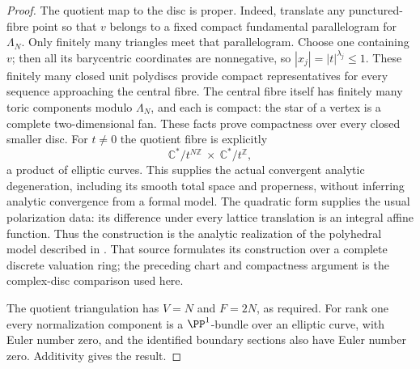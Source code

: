 \begin{proof}
The quotient map to the disc is proper. Indeed, translate any
punctured-fibre point so that $v$ belongs to a fixed compact
fundamental parallelogram for $\Lambda_N$. Only finitely many
triangles meet that parallelogram. Choose one containing $v$;
then all its barycentric coordinates are nonnegative, so
$|x_j|=|t|^{\lambda_j}\le1$. These finitely many closed unit
polydiscs provide compact representatives for every sequence
approaching the central fibre. The central fibre itself has
finitely many toric components modulo $\Lambda_N$, and each is
compact: the star of a vertex is a complete two-dimensional fan.
These facts prove compactness over every closed smaller disc.
For $t\ne0$ the quotient fibre is explicitly
\[
 \mathbb C^*/t^{N\mathbb Z}\ \times\
 \mathbb C^*/t^{\mathbb Z},
\]
a product of elliptic curves. This supplies the actual convergent
analytic degeneration, including its smooth total space and
properness, without inferring analytic convergence from a formal
model. The quadratic form supplies the usual polarization data:
its difference under every lattice translation is an integral
affine function. Thus the construction is the analytic realization
of the polyhedral model described in
\cite[Section~6, especially (6.3)--(6.7)]{Mumford1972}.
That source formulates its construction over a complete discrete
valuation ring; the preceding chart and compactness argument is
the complex-disc comparison used here.

The quotient triangulation has $V=N$ and $F=2N$, as required.
For rank one every normalization component is a $\PP^1$-bundle over an elliptic curve, with Euler number zero, and the identified boundary sections also have Euler number zero. Additivity gives the result.
\end{proof}
